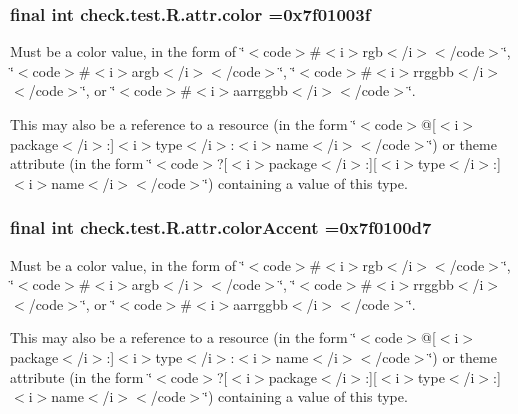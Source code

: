 \subsubsection[{color}]{\setlength{\rightskip}{0pt plus 5cm}final int check.\+test.\+R.\+attr.\+color =0x7f01003f\hspace{0.3cm}{\ttfamily [static]}}\label{classcheck_1_1test_1_1_r_1_1attr_af9989d7fffc42548bab33bf748aff2e2}
Must be a color value, in the form of \char`\"{}$<$code$>$\#$<$i$>$rgb$<$/i$>$$<$/code$>$\char`\"{}, \char`\"{}$<$code$>$\#$<$i$>$argb$<$/i$>$$<$/code$>$\char`\"{}, \char`\"{}$<$code$>$\#$<$i$>$rrggbb$<$/i$>$$<$/code$>$\char`\"{}, or \char`\"{}$<$code$>$\#$<$i$>$aarrggbb$<$/i$>$$<$/code$>$\char`\"{}. 

This may also be a reference to a resource (in the form \char`\"{}$<$code$>$@\mbox{[}$<$i$>$package$<$/i$>$\+:\mbox{]}$<$i$>$type$<$/i$>$\+:$<$i$>$name$<$/i$>$$<$/code$>$\char`\"{}) or theme attribute (in the form \char`\"{}$<$code$>$?\mbox{[}$<$i$>$package$<$/i$>$\+:\mbox{]}\mbox{[}$<$i$>$type$<$/i$>$\+:\mbox{]}$<$i$>$name$<$/i$>$$<$/code$>$\char`\"{}) containing a value of this type. \hypertarget{classcheck_1_1test_1_1_r_1_1attr_aa81fc3f823f687d62d265d42b27599e5}{}
\subsubsection[{color\+Accent}]{\setlength{\rightskip}{0pt plus 5cm}final int check.\+test.\+R.\+attr.\+color\+Accent =0x7f0100d7\hspace{0.3cm}{\ttfamily [static]}}\label{classcheck_1_1test_1_1_r_1_1attr_aa81fc3f823f687d62d265d42b27599e5}
Must be a color value, in the form of \char`\"{}$<$code$>$\#$<$i$>$rgb$<$/i$>$$<$/code$>$\char`\"{}, \char`\"{}$<$code$>$\#$<$i$>$argb$<$/i$>$$<$/code$>$\char`\"{}, \char`\"{}$<$code$>$\#$<$i$>$rrggbb$<$/i$>$$<$/code$>$\char`\"{}, or \char`\"{}$<$code$>$\#$<$i$>$aarrggbb$<$/i$>$$<$/code$>$\char`\"{}. 

This may also be a reference to a resource (in the form \char`\"{}$<$code$>$@\mbox{[}$<$i$>$package$<$/i$>$\+:\mbox{]}$<$i$>$type$<$/i$>$\+:$<$i$>$name$<$/i$>$$<$/code$>$\char`\"{}) or theme attribute (in the form \char`\"{}$<$code$>$?\mbox{[}$<$i$>$package$<$/i$>$\+:\mbox{]}\mbox{[}$<$i$>$type$<$/i$>$\+:\mbox{]}$<$i$>$name$<$/i$>$$<$/code$>$\char`\"{}) containing a value of this type. \hypertarget{classcheck_1_1test_1_1_r_1_1attr_abef35f07161bdd7ae466dc158b37e59b}{}
